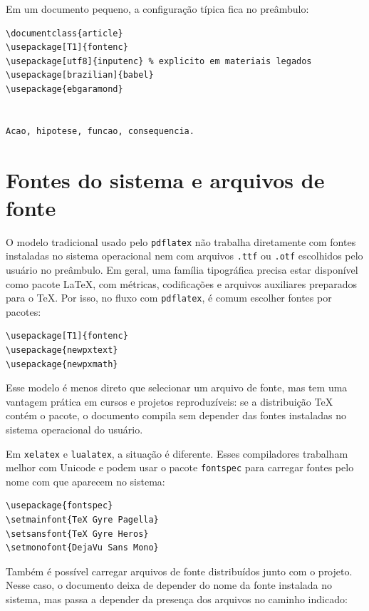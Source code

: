 Em um documento pequeno, a configuração típica fica no preâmbulo:

\begin{lstlisting}[language={[latex]TeX}, caption={Configuração básica de fonte no pdfLaTeX}]
\documentclass{article}
\usepackage[T1]{fontenc}
\usepackage[utf8]{inputenc} % explicito em materiais legados
\usepackage[brazilian]{babel}
\usepackage{ebgaramond}


Acao, hipotese, funcao, consequencia.

\end{lstlisting}

\section{Fontes do sistema e arquivos de fonte}

O modelo tradicional usado pelo \texttt{pdflatex} não trabalha diretamente com fontes instaladas no sistema operacional nem com arquivos \texttt{.ttf} ou \texttt{.otf} escolhidos pelo usuário no preâmbulo. Em geral, uma família tipográfica precisa estar disponível como pacote \LaTeX, com métricas, codificações e arquivos auxiliares preparados para o TeX. Por isso, no fluxo com \texttt{pdflatex}, é comum escolher fontes por pacotes:

\begin{lstlisting}[language={[latex]TeX}, caption={Fonte por pacote no pdfLaTeX}]
\usepackage[T1]{fontenc}
\usepackage{newpxtext}
\usepackage{newpxmath}
\end{lstlisting}

Esse modelo é menos direto que selecionar um arquivo de fonte, mas tem uma vantagem prática em cursos e projetos reproduzíveis: se a distribuição TeX contém o pacote, o documento compila sem depender das fontes instaladas no sistema operacional do usuário.

Em \texttt{xelatex} e \texttt{lualatex}, a situação é diferente. Esses compiladores trabalham melhor com Unicode e podem usar o pacote \texttt{fontspec} para carregar fontes pelo nome com que aparecem no sistema:

\begin{lstlisting}[language={[latex]TeX}, caption={Fonte instalada no sistema com XeLaTeX ou LuaLaTeX}]
\usepackage{fontspec}
\setmainfont{TeX Gyre Pagella}
\setsansfont{TeX Gyre Heros}
\setmonofont{DejaVu Sans Mono}
\end{lstlisting}

Também é possível carregar arquivos de fonte distribuídos junto com o projeto. Nesse caso, o documento deixa de depender do nome da fonte instalada no sistema, mas passa a depender da presença dos arquivos no caminho indicado:

